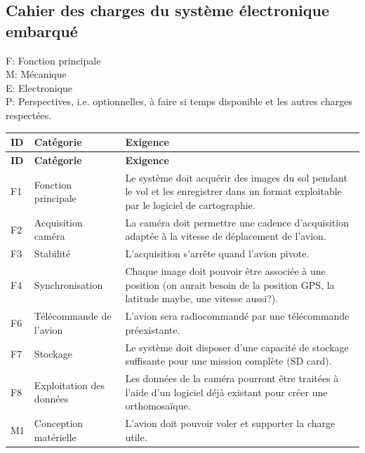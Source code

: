 \documentclass[11pt,a4paper]{article}
\begin{document}
\subsection{Cahier des charges du système électronique embarqué}

F: Fonction principale \\
M: Mécanique \\
E: Electronique \\
P: Perspectives, i.e. optionnelles, à faire si temps disponible et les autres charges respectées.

\begin{longtable}{|p{1cm}|p{3cm}|p{\dimexpr\textwidth-1cm-3cm-4\tabcolsep-4\arrayrulewidth\relax}|}
\hline
\textbf{ID} & \textbf{Catégorie} & \textbf{Exigence} \\ \hline
\endfirsthead

\hline
\textbf{ID} & \textbf{Catégorie} & \textbf{Exigence} \\ \hline
\endhead

F1 & Fonction principale &
Le système doit acquérir des images du sol pendant le vol et les enregistrer dans un format exploitable par le logiciel de cartographie. \\ \hline

F2 & Acquisition caméra &
La caméra doit permettre une cadence d'acquisition adaptée à la vitesse de déplacement de l'avion. \\ \hline

F3 & Stabilité &
L'acquisition s'arrête quand l'avion pivote. \\ \hline

F4 & Synchronisation &
Chaque image doit pouvoir être associée à une position (on aurait besoin de la position GPS, la latitude maybe, une vitesse aussi?). \\ \hline

F6 & Télécommande de l'avion &
L'avion sera radiocommandé par une télécommande préexistante. \\ \hline

F7 & Stockage &
Le système doit disposer d'une capacité de stockage suffisante pour une mission complète (SD card). \\ \hline

F8 & Exploitation des données &
Les données de la caméra pourront être traitées à l'aide d'un logiciel déjà existant pour créer une orthomosaïque. \\ \hline

M1 & Conception matérielle &
L'avion doit pouvoir voler et supporter la charge utile. \\ \hline


\end{longtable}
\end{document}
